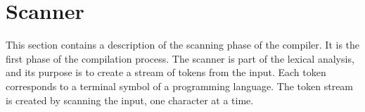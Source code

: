 \section{Scanner}
This section contains a description of the scanning phase of the compiler. It is the first phase of the compilation process. The scanner is part of the lexical analysis, and its purpose is to create a stream of tokens from the input. Each token corresponds to a terminal symbol of a programming language. The token stream is created by scanning the input, one character at a time.  


 